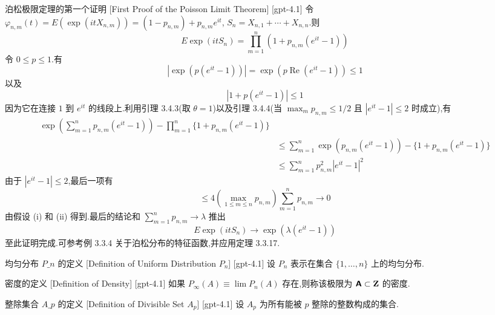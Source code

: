\documentclass[UTF8]{ctexart}
\begin{document}
    \begin{prf}
        {泊松极限定理的第一个证明}
        [First Proof of the Poisson Limit Theorem]
        [gpt-4.1]
        令 $\varphi_{n,m}(t) = E(\exp(i t X_{n,m})) = (1 - p_{n,m}) + p_{n,m} e^{i t}$, $S_n = X_{n,1} + \cdots + X_{n,n}$.则
\[
E \exp(i t S_n) = \prod_{m = 1}^{n} (1 + p_{n,m}(e^{i t} - 1))
\]
令 $0 \leq p \leq 1$.有
\[
|\exp(p (e^{i t} - 1))| = \exp(p \operatorname{Re}(e^{i t} - 1)) \leq 1
\]
以及
\[
|1 + p(e^{i t} - 1)| \leq 1
\]
因为它在连接 $1$ 到 $e^{i t}$ 的线段上.利用引理 3.4.3(取 $\theta = 1$)以及引理 3.4.4(当 $\max_m p_{n,m} \leq 1/2$ 且 $|e^{i t} - 1| \leq 2$ 时成立),有
\[
\begin{array}{cl}
\displaystyle \left.\exp\left( \sum_{m = 1}^{n} p_{n,m}(e^{i t} - 1) \right) - \prod_{m = 1}^{n} \{ 1 + p_{n,m}(e^{i t} - 1) \} \right.\\
 & \displaystyle \leq \sum_{m = 1}^{n} \left.\exp(p_{n,m}(e^{i t} - 1)) - \{ 1 + p_{n,m}(e^{i t} - 1) \} \right.\\
 & \displaystyle \leq \sum_{m = 1}^{n} p_{n,m}^2 |e^{i t} - 1|^2
\end{array}
\]
由于 $|e^{i t} - 1| \leq 2$,最后一项有
\[
\leq 4 (\max_{1 \leq m \leq n} p_{n,m}) \sum_{m = 1}^{n} p_{n,m} \to 0
\]
由假设 (i) 和 (ii) 得到.最后的结论和 $\sum_{m = 1}^{n} p_{n,m} \to \lambda$ 推出
\[
E \exp(i t S_n) \to \exp(\lambda (e^{i t} - 1))
\]
至此证明完成.可参考例 3.3.4 关于泊松分布的特征函数,并应用定理 3.3.17.
    \end{prf}
    
    
    
    \begin{dfn}
        {均匀分布 $P\_n$ 的定义}
        [Definition of Uniform Distribution $P_n$]
        [gpt-4.1]
        设 $P_{n}$ 表示在集合 $\{1, \ldots, n\}$ 上的均匀分布.
    \end{dfn}
    
    
    
    \begin{dfn}
        {密度的定义}
        [Definition of Density]
        [gpt-4.1]
        如果 $P_{\infty}(A) \equiv \lim P_{n}(A)$ 存在,则称该极限为 ${\textbf{\textsf{A}}} \subset \mathbf{Z}$ 的密度.
    \end{dfn}
    
    
    
    \begin{dfn}
        {整除集合 $A\_p$ 的定义}
        [Definition of Divisible Set $A_p$]
        [gpt-4.1]
        设 $A_{p}$ 为所有能被 $p$ 整除的整数构成的集合.
    \end{dfn}
    
\end{document}
